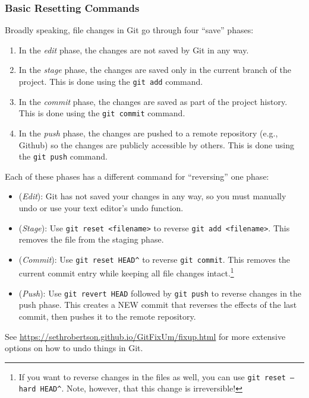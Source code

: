\documentclass[12pt]{article}
\begin{document}
\subsubsection{Basic Resetting Commands}
Broadly speaking, file changes in Git go through four ``save'' phases:
\begin{enumerate}
    \item In the \emph{edit} phase, the changes are not saved by Git in any way.
    \item In the \emph{stage} phase, the changes are saved only in the current branch of the project. This is done using the \texttt{git add} command.
    \item In the \emph{commit} phase, the changes are saved as part of the project history. This is done using the \texttt{git commit} command.
    \item In the \emph{push} phase, the changes are pushed to a remote repository (e.g., Github) so the changes are publicly accessible by others. This is done using the \texttt{git push} command.
\end{enumerate}
Each of these phases has a different command for ``reversing'' one phase:
\begin{itemize}
    \item (\emph{Edit}): Git has not saved your changes in any way, so you must manually undo or use your text editor's undo function.
    \item (\emph{Stage}): Use \texttt{git reset <filename>} to reverse \texttt{git add <filename>}. This removes the file from the staging phase.
    \item (\emph{Commit}): Use \texttt{git reset HEAD\^} to reverse \texttt{git commit}. This removes the current commit entry while keeping all file changes intact.\footnote{If you want to reverse changes in the files as well, you can use \texttt{git reset --hard HEAD\^}. Note, however, that this change is irreversible!}
    \item (\emph{Push}): Use \texttt{git revert HEAD} followed by \texttt{git push} to reverse changes in the push phase. This creates a NEW commit that reverses the effects of the last commit, then pushes it to the remote repository.
\end{itemize}
See \url{https://sethrobertson.github.io/GitFixUm/fixup.html} for more extensive options on how to undo things in Git.
\end{document}
